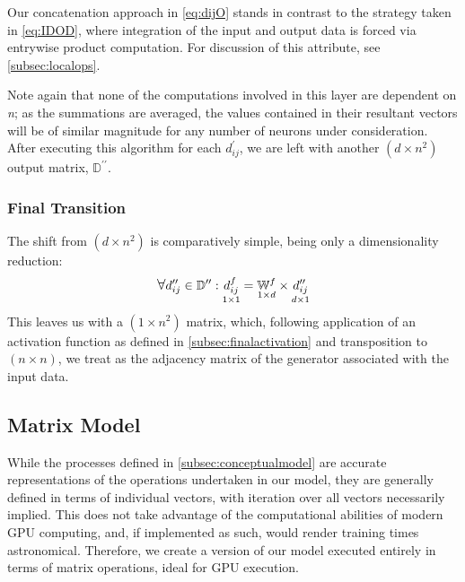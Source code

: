 Our concatenation approach in \eqref{eq:dijO} stands in contrast to the strategy 
taken in \eqref{eq:IDOD}, where integration of the input and output data is 
forced via entrywise product computation. For discussion of this attribute, see 
\ref{subsec:localops}.

Note again that none of the computations involved in this layer are dependent on 
\textit{n}; as the summations are averaged, the values contained in their 
resultant vectors will be of similar magnitude for any number of neurons under 
consideration. After executing this algorithm for each $d_{ij}^{\prime}$, we are 
left with another $(d \times n^2)$ output matrix, $\mathbb{D}^{\prime\prime}$.

\subsubsection{Final Transition}
The shift from $(d \times n^2)$ is comparatively simple, being only a 
dimensionality reduction:
\begin{equation}
	\label{eq:conceptfinal}
	\mathlarger\forall d_{ij}^{\prime\prime} \in \mathbb{D}^{\prime\prime}:
	\underset{1 \times 1}{d_{ij}^f} = \underset{1 \times d}{\mathbb{W}^f} \times 
	\underset{d \times 1}{d_{ij}^{\prime\prime}}
\end{equation}
This leaves us with a $(1 \times n^2)$ matrix, which, following application of 
an activation function as defined in \ref{subsec:finalactivation} and 
transposition to $(n \times n)$, we treat as the adjacency matrix of the 
generator associated with the input data.

\subsection{Matrix Model}
\label{subsec:matmodel}
While the processes defined in \ref{subsec:conceptualmodel} are accurate 
representations of the operations undertaken in our model, they are generally 
defined in terms of individual vectors, with iteration over all vectors 
necessarily implied. This does not take advantage of the computational abilities 
of modern GPU computing, and, if implemented as such, would render training 
times astronomical. Therefore, we create a version of our model executed 
entirely in terms of matrix operations, ideal for GPU execution.

